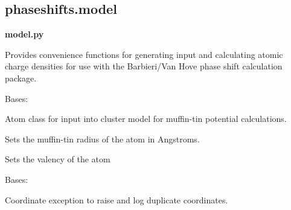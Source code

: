 \documentclass[letterpaper,10pt,english]{sphinxmanual}
\begin{document}
\subsection{phaseshifts.model}
\label{modules:module-phaseshifts.model}\label{modules:phaseshifts-model}
\textbf{model.py}

Provides convenience functions for generating input and calculating 
atomic charge densities for use with the Barbieri/Van Hove phase 
shift calculation package.

\begin{fulllineitems}
\label{modules:phaseshifts.model.Atom}
Bases: 

Atom class for input into cluster model for muffin-tin potential
calculations.

\begin{fulllineitems}
\label{modules:phaseshifts.model.Atom.set_coordinates}
\end{fulllineitems}


\begin{fulllineitems}
\label{modules:phaseshifts.model.Atom.set_mufftin_radius}
Sets the muffin-tin radius of the atom in Angstroms.

\end{fulllineitems}


\begin{fulllineitems}
\label{modules:phaseshifts.model.Atom.set_valence}
Sets the valency of the atom

\end{fulllineitems}


\end{fulllineitems}


\begin{fulllineitems}
\label{modules:phaseshifts.model.CoordinatesError}
Bases: 

Coordinate exception to raise and log duplicate coordinates.

\end{fulllineitems}
\end{document}
